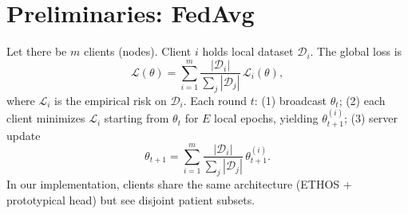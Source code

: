 \section{Preliminaries: FedAvg}
\label{sec:prelim}

Let there be $m$ clients (nodes). Client $i$ holds local dataset $\mathcal{D}_i$. The global loss is
\begin{equation}
  \mathcal{L}(\theta) = \sum_{i=1}^{m} \frac{|\mathcal{D}_i|}{\sum_j |\mathcal{D}_j|} \, \mathcal{L}_i(\theta),
\end{equation}
where $\mathcal{L}_i$ is the empirical risk on $\mathcal{D}_i$. Each round $t$: (1) broadcast $\theta_t$; (2) each client minimizes $\mathcal{L}_i$ starting from $\theta_t$ for $E$ local epochs, yielding $\theta_{t+1}^{(i)}$; (3) server update
\begin{equation}
  \theta_{t+1} = \sum_{i=1}^{m} \frac{|\mathcal{D}_i|}{\sum_j |\mathcal{D}_j|} \, \theta_{t+1}^{(i)}.
\end{equation}
In our implementation, clients share the same architecture (ETHOS + prototypical head) but see disjoint patient subsets.
